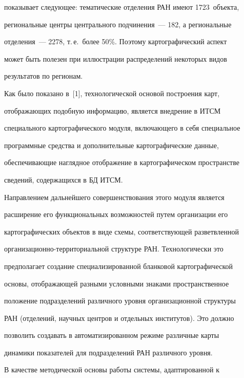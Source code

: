 показывает следующее: тематические отделения РАН имеют 1723~объекта, 


региональные центры центрального подчинения~--- 182, а региональные 


отделения~--- 2278, т.\,е.\ более 50\%. Поэтому картографический аспект 


может быть полезен при иллюстрации распределений некоторых видов 


результатов по регионам.


     


     Как было показано в~[1], технологической основой построения карт, 


отоб\-ра\-жа\-ющих подобную информацию, является внедрение в ИТСМ 


специального картографического модуля, включающего в себя  специальное 


программные средства и дополнительные картографические данные, 


обеспечивающие наглядное отображение в картографическом пространстве 


сведений, содержащихся в БД ИТСМ.


     


     Направлением дальнейшего совершенствования этого модуля является 


расширение его функциональных возможностей путем организации его 


картографических объектов в виде схемы, соответствующей разветвленной 


организационно-тер\-ри\-то\-ри\-аль\-ной структуре РАН. Технологически это 


предполагает создание специализированной бланковой картографической 


основы, отображающей разными условными знаками пространственное 


положение подразделений различного уровня организационной структуры 


РАН (отделений, научных центров и отдельных институтов). Это должно 


позволить создавать в автоматизированном режиме различные карты 


динамики показателей для подразделений РАН различного уровня. 


     


     В качестве методической основы работы системы, адаптированной к 


